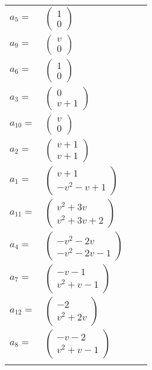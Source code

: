\documentclass[1p]{elsarticle_modified}
\theoremstyle{definition}
\begin{document}
\begin{tabular}{m{7pt} m{180pt} m{7pt} m{180pt} }
\flushright $a_{5}=$&$\begin{pmatrix}1\\0\end{pmatrix}$ \\
\flushright $a_{9}=$&$\begin{pmatrix}v\\0\end{pmatrix}$ \\
\flushright $a_{6}=$&$\begin{pmatrix}1\\0\end{pmatrix}$ \\
\flushright $a_{3}=$&$\begin{pmatrix}0\\v+1\end{pmatrix}$ \\
\flushright $a_{10}=$&$\begin{pmatrix}v\\0\end{pmatrix}$ \\
\flushright $a_{2}=$&$\begin{pmatrix}v+1\\v+1\end{pmatrix}$ \\
\flushright $a_{1}=$&$\begin{pmatrix}v+1\\- v^2- v+1\end{pmatrix}$ \\
\flushright $a_{11}=$&$\begin{pmatrix}v^2+3 v\\v^2+3 v+2\end{pmatrix}$ \\
\flushright $a_{4}=$&$\begin{pmatrix}- v^2-2 v\\- v^2-2 v-1\end{pmatrix}$ \\
\flushright $a_{7}=$&$\begin{pmatrix}- v-1\\v^2+v-1\end{pmatrix}$ \\
\flushright $a_{12}=$&$\begin{pmatrix}-2\\v^2+2 v\end{pmatrix}$ \\
\flushright $a_{8}=$&$\begin{pmatrix}- v-2\\v^2+v-1\end{pmatrix}$\\&\end{tabular}
\end{document}
